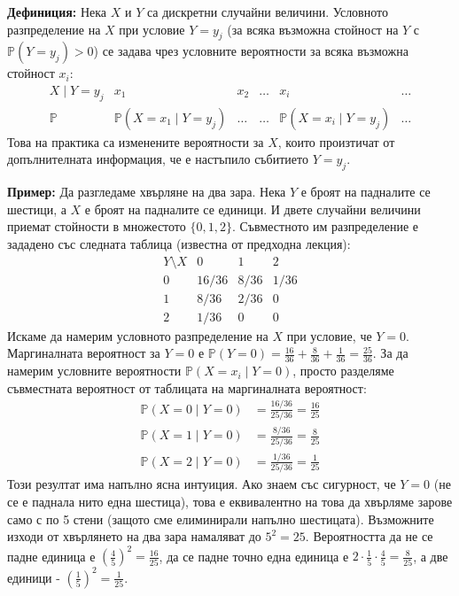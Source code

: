 \documentclass{article}
\begin{document}
\textbf{Дефиниция:} Нека $X$ и $Y$ са дискретни случайни величини. Условното разпределение на $X$ при условие $Y=y_j$ (за всяка възможна стойност на $Y$ с $\mathbb{P}(Y=y_j)>0$) се задава чрез условните вероятности за всяка възможна стойност $x_i$:
\[
\begin{array}{c|c|c|c|c|c}
X \mid Y=y_j & x_1 & x_2 & \dots & x_i & \dots \\
\hline
\mathbb{P} & \mathbb{P}(X=x_1 \mid Y=y_j) & \dots & \dots & \mathbb{P}(X=x_i \mid Y=y_j) & \dots
\end{array}
\]
Това на практика са изменените вероятности за $X$, които произтичат от допълнителната информация, че е настъпило събитието $Y=y_j$.

\textbf{Пример:} Да разгледаме хвърляне на два зара. Нека $Y$ е броят на падналите се шестици, а $X$ е броят на падналите се единици. И двете случайни величини приемат стойности в множестото $\{0, 1, 2\}$. Съвместното им разпределение е зададено със следната таблица (известна от предходна лекция):
\[
\begin{array}{c|c|c|c}
Y \setminus X & 0 & 1 & 2 \\
\hline
0 & 16/36 & 8/36 & 1/36 \\
\hline
1 & 8/36 & 2/36 & 0 \\
\hline
2 & 1/36 & 0 & 0
\end{array}
\]
Искаме да намерим условното разпределение на $X$ при условие, че $Y=0$. Маргиналната вероятност за $Y=0$ е $\mathbb{P}(Y=0) = \frac{16}{36} + \frac{8}{36} + \frac{1}{36} = \frac{25}{36}$. За да намерим условните вероятности $\mathbb{P}(X=x_i \mid Y=0)$, просто разделяме съвместната вероятност от таблицата на маргиналната вероятност:
\begin{align*}
\mathbb{P}(X=0 \mid Y=0) &= \frac{16/36}{25/36} = \frac{16}{25} \\
\mathbb{P}(X=1 \mid Y=0) &= \frac{8/36}{25/36} = \frac{8}{25} \\
\mathbb{P}(X=2 \mid Y=0) &= \frac{1/36}{25/36} = \frac{1}{25}
\end{align*}
Този резултат има напълно ясна интуиция. Ако знаем със сигурност, че $Y=0$ (не се е паднала нито една шестица), това е еквивалентно на това да хвърляме зарове само с по 5 стени (защото сме елиминирали напълно шестицата). Възможните изходи от хвърлянето на два зара намаляват до $5^2 = 25$. Вероятността да не се падне единица е $\left(\frac{4}{5}\right)^2 = \frac{16}{25}$, да се падне точно една единица е $2 \cdot \frac{1}{5} \cdot \frac{4}{5} = \frac{8}{25}$, а две единици - $\left(\frac{1}{5}\right)^2 = \frac{1}{25}$.
\end{document}
